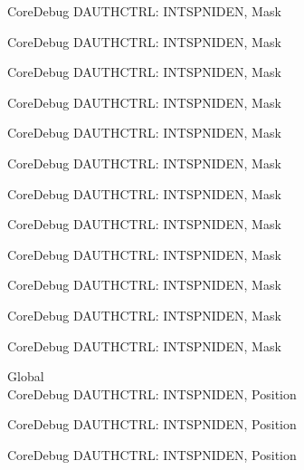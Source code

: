 \begin{DoxyRefList}
\label{deprecated__deprecated000358}%
%
Core\+Debug DAUTHCTRL\+: INTSPNIDEN, Mask 

\label{deprecated__deprecated000434}%
%
Core\+Debug DAUTHCTRL\+: INTSPNIDEN, Mask 

\label{deprecated__deprecated000537}%
%
Core\+Debug DAUTHCTRL\+: INTSPNIDEN, Mask 

\label{deprecated__deprecated000639}%
%
Core\+Debug DAUTHCTRL\+: INTSPNIDEN, Mask 

\label{deprecated__deprecated000764}%
%
Core\+Debug DAUTHCTRL\+: INTSPNIDEN, Mask 

\label{deprecated__deprecated000818}%
%
Core\+Debug DAUTHCTRL\+: INTSPNIDEN, Mask 

\label{deprecated__deprecated000894}%
%
Core\+Debug DAUTHCTRL\+: INTSPNIDEN, Mask 

\label{deprecated__deprecated000957}%
%
Core\+Debug DAUTHCTRL\+: INTSPNIDEN, Mask 

\label{deprecated__deprecated001036}%
%
Core\+Debug DAUTHCTRL\+: INTSPNIDEN, Mask 

\label{deprecated__deprecated001112}%
%
Core\+Debug DAUTHCTRL\+: INTSPNIDEN, Mask 

\label{deprecated__deprecated001215}%
%
Core\+Debug DAUTHCTRL\+: INTSPNIDEN, Mask 

\label{deprecated__deprecated001317}%
%
Core\+Debug DAUTHCTRL\+: INTSPNIDEN, Mask  
\item[Global \doxylink{group___c_m_s_i_s___s_c_b_gaf733a36e6b4717a604f7d77c05dfceb4}{Core\+Debug\+\_\+\+DAUTHCTRL\+\_\+\+INTSPNIDEN\+\_\+\+Pos} ]\hfill \\
\label{deprecated__deprecated000085}%
%
Core\+Debug DAUTHCTRL\+: INTSPNIDEN, Position 

\label{deprecated__deprecated000139}%
%
Core\+Debug DAUTHCTRL\+: INTSPNIDEN, Position 

\label{deprecated__deprecated000215}%
%
Core\+Debug DAUTHCTRL\+: INTSPNIDEN, Position 


\end{DoxyRefList}
